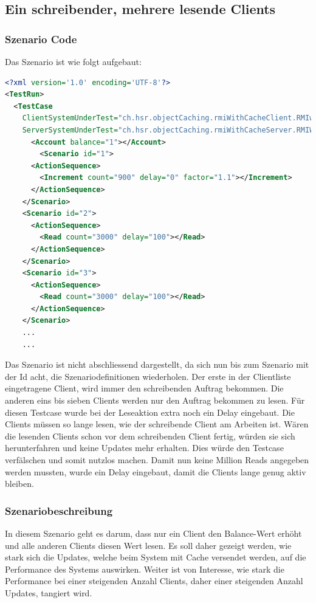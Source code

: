 \subsection{Ein schreibender, mehrere lesende Clients}
\subsubsection{Szenario Code}
Das Szenario ist wie folgt aufgebaut:
\begin{lstlisting}[language=XML, breaklines=true]
<?xml version='1.0' encoding='UTF-8'?>
<TestRun>
  <TestCase
    ClientSystemUnderTest="ch.hsr.objectCaching.rmiWithCacheClient.RMIwithCacheClientSystem"
    ServerSystemUnderTest="ch.hsr.objectCaching.rmiWithCacheServer.RMIWithCacheServerSystem">
      <Account balance="1"></Account>
        <Scenario id="1">
	  <ActionSequence>
	    <Increment count="900" delay="0" factor="1.1"></Increment>
	  </ActionSequence>
	</Scenario>
	<Scenario id="2">
	  <ActionSequence>
	    <Read count="3000" delay="100"></Read>
	  </ActionSequence>
	</Scenario>
	<Scenario id="3">
	  <ActionSequence>
	    <Read count="3000" delay="100"></Read>
	  </ActionSequence>
	</Scenario>
	...
	...
\end{lstlisting}

Das Szenario ist nicht abschliessend dargestellt, da sich nun bis zum Szenario mit der Id acht, die Szenariodefinitionen wiederholen. Der erste in der Clientliste eingetragene Client, wird immer den schreibenden Auftrag bekommen. Die anderen eins bis sieben Clients werden nur den Auftrag bekommen zu lesen. \newline
Für diesen Testcase wurde bei der Leseaktion extra noch ein Delay eingebaut. Die Clients müssen so lange lesen, wie der schreibende Client am Arbeiten ist. Wären die lesenden Clients schon vor dem schreibenden Client fertig, würden sie sich herunterfahren und keine Updates mehr erhalten. Dies würde den Testcase verfälschen und somit nutzlos machen. Damit nun keine Million Reads angegeben werden mussten, wurde ein Delay eingebaut, damit die Clients lange genug aktiv bleiben. 
\subsubsection{Szenariobeschreibung}
In diesem Szenario geht es darum, dass nur ein Client den Balance-Wert erhöht und alle anderen Clients diesen Wert lesen. Es soll daher gezeigt werden, wie stark sich die Updates, welche beim System mit Cache versendet werden, auf die Performance des Systems auswirken. Weiter ist von Interesse, wie stark die Performance bei einer steigenden Anzahl Clients, daher einer steigenden Anzahl Updates, tangiert wird. \\

